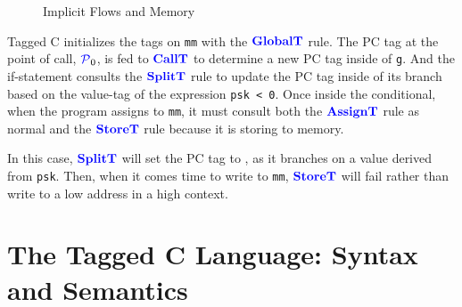 \documentclass{llncs}
\begin{document}
\begin{figure}
\caption{Implicit Flows and Memory}
\label{fig:ex2}
\end{figure}

Tagged C initializes the tags on {\tt mm} with the \(\color{blue} \mathbf{GlobalT}\) rule. The PC tag
at the point of call, \(\mathcal{\color{blue} P\mathit{}}_0\), is fed to \(\color{blue} \mathbf{CallT}\) to determine a new PC tag
inside of {\tt g}. And the if-statement consults the \(\color{blue} \mathbf{SplitT}\) rule to update the PC tag
inside of its branch based on the value-tag of the expression {\tt psk < 0}. Once inside the
conditional, when the program assigns to {\tt mm}, it must consult both the
\(\color{blue} \mathbf{AssignT}\) rule as normal and the \(\color{blue} \mathbf{StoreT}\) rule because it is storing
to memory.

\begin{figure}
\end{figure}

In this case, \(\color{blue} \mathbf{SplitT}\) will set the PC tag to \high, as it branches on a value derived from {\tt psk}.
Then, when it comes time to write to {\tt mm}, \(\color{blue} \mathbf{StoreT}\) will fail rather than write to a low address
in a high context.

\section{The Tagged C Language: Syntax and Semantics}
\label{sec:language}
\end{document}
